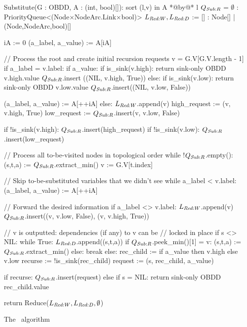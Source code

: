 \begin{lstfloat}
  \centering

  \begin{blstlisting}
  Substitute(G : OBDD, A : (int, bool)[]):
      sort (l,v) in A *@by@* l
      $\SubstituteQrec$ = $\emptyset$ : PriorityQueue<(Node$\times$NodeArc.Link$\times$bool)>
      $\ReduceLwork, \ReduceLdep$ := [] : Node[] | (Node,NodeArc,bool)[]

      iA := 0
      (a_label, a_value) := A[iA]

      // Process the root and create initial recursion requests
      v = G.V[G.V.length - 1]
      if a_label = v.label:
          if a_value:
              if is_sink(v.high): return sink-only OBDD v.high.value
              $\SubstituteQrec$.insert ((NIL, v.high, True))
          else:
              if is_sink(v.low): return sink-only OBDD v.low.value
              $\SubstituteQrec$.insert((NIL, v.low, False))

          (a_label, a_value) := A[++iA]
      else:
          $\ReduceLwork$.append(v)
          high_request := (v, v.high, True)
          low_request := $\SubstituteQrec$.insert(v, v.low, False)

          if !is_sink(v.high): $\SubstituteQrec$.insert(high_request)
          if !is_sink(v.low):  $\SubstituteQrec$.insert(low_request)

      // Process all to-be-visited nodes in topological order
      while !$\SubstituteQrec$.empty():
          (s,t,a) := $\SubstituteQrec$.extract_min()
          v := G.V[t.index]

          // Skip to-be-substituted variables that we didn't see
          while a_label < v.label: (a_label, a_value) := A[++iA]

          // Forward the desired information
          if a_label <> v.label:
              $\ReduceLwork$.append(v)
              $\SubstituteQrec$.insert((v, v.low, False), (v, v.high, True))

              // v is outputted: dependencies (if any) to v can be
              // locked in place
              if s <> NIL:
                  while True:
                      $\ReduceLdep$.append((s,t,a))
                      if $\SubstituteQrec$.peek_min()[1] = v:
                          (s,t,a) := $\SubstituteQrec$.extract_min()
                      else: break
          else:
              rec_child := if a_value then v.high else v.low
              recurse := !is_sink(rec_child)
              request := (s, rec_child, a_value)

              if recurse: $\SubstituteQrec$.insert(request)
              else if s = NIL: return sink-only OBDD rec_child.value

      return Reduce($\ReduceLwork, \ReduceLdep, \emptyset$)
  \end{blstlisting}

  \caption{The \Substitute\ algorithm}
  \label{lst:substitute}
\end{lstfloat}

